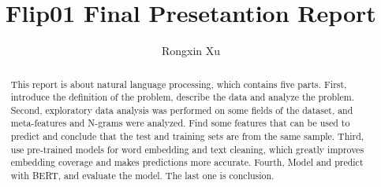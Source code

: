 \documentclass{amsart}
\begin{document}
%
%
\title[Xu's report]{Flip01 Final Presetantion Report}%

\author{Rongxin Xu}
\address[A.~1]{School of Business Administration,\\ 
Hunan University, Changsha 410012, China}%

%
%
\date{\gitAuthorDate}%

\begin{abstract}
This report is about natural language processing,
which contains five parts. 
First, introduce the definition of the problem,
describe the data and analyze the problem. 
Second, exploratory data analysis was performed 
on some fields of the dataset, and meta-features and 
N-grams were analyzed. Find some features that can be used 
to predict and conclude that the test and training sets 
are from the same sample. 
Third, use pre-trained models for word embedding 
and text cleaning, which greatly improves embedding 
coverage and makes predictions more accurate.
Fourth, Model and predict with BERT, and evaluate the model.
The last one is conclusion. 
\end{abstract}

\maketitle
\tableofcontents

\newpage



\newpage



\listoftodos
\end{document}
